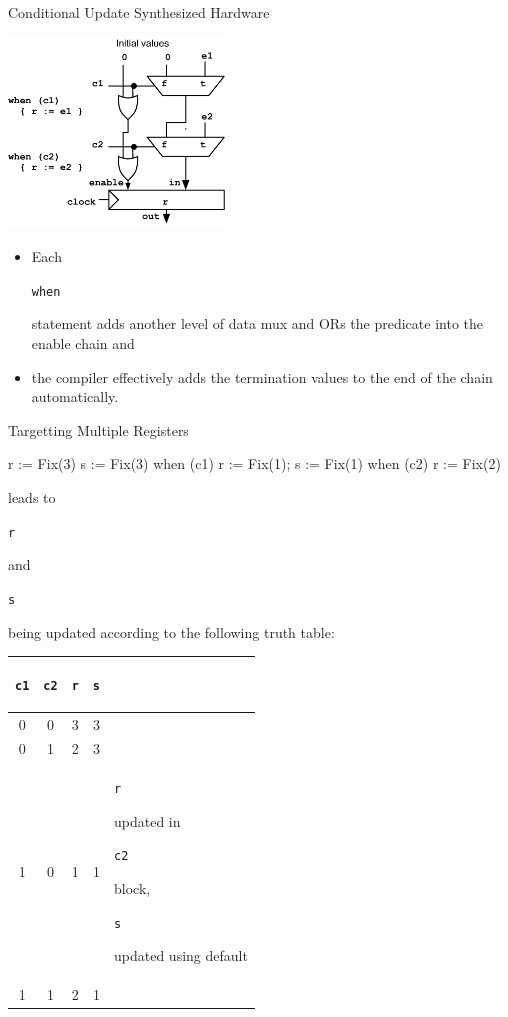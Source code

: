 \documentclass[xcolor=pdflatex,dvipsnames,table]{beamer}
\newcommand{\code}[1]{\begin{footnotesize}{\tt #1}\end{footnotesize}}
\begin{document}
\begin{frame}[fragile]{Conditional Update Synthesized Hardware}

\begin{center}
\includegraphics[height=2in]{figs/condupdates.pdf}
\end{center}

\begin{itemize}
\item Each \code{when} statement adds another level of data mux and ORs
  the predicate into the enable chain and
\item the compiler effectively adds
  the termination values to the end of the chain automatically.
\end{itemize}

\end{frame}

\begin{frame}[fragile]{Targetting Multiple Registers}

\begin{scala}
r := Fix(3) 
s := Fix(3)
when (c1) { r := Fix(1); s := Fix(1) }
when (c2) { r := Fix(2) }
\end{scala}

leads to \code{r} and \code{s} being updated according to the
following truth table:

{\footnotesize
\begin{center}
\begin{tabular}{|c|c|c|c|l|}
\hline
\code{c1} & \code{c2}  & \code{r} & \code{s} & \\
\hline 
0 &  0 & 3 & 3 & \\
0 &  1 & 2 & 3 & \\ 
1 &  0 & 1 & 1 & \code{r} updated in \code{c2} block, \code{s} updated using default \\
1 &  1 & 2 & 1 & \\
\hline
\end{tabular}
\end{center}
}


\end{frame}
\end{document}

